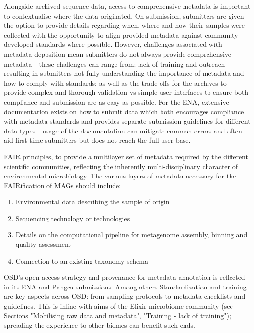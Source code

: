    Alongside archived sequence data, access to comprehensive metadata is important to contextualise where the data originated. 
   On submission, submitters are given the option to provide details regarding when, where and how their samples were collected with the opportunity to align provided metadata against community developed standards where possible. 
   However, challenges associated with metadata deposition mean submitters do not always provide comprehensive metadata - these challenges can range from: 
   lack of training and outreach resulting in submitters not fully understanding the importance of metadata and how to comply with standards; 
   as well as the trade-offs for the archives to provide complex and thorough validation vs simple user interfaces to ensure both compliance and submission are as easy as possible. 
   For the ENA, extensive documentation exists on how to submit data which both encourages compliance with metadata standards and provides separate submission guidelines for different data types - usage of the documentation can mitigate common errors and often aid first-time submitters but does not reach the full user-base. 

   FAIR principles, to provide a multilayer set of metadata required by the different scientific communities, reflecting the inherently multi-disciplinary character of environmental microbiology. 
   The various layers of metadata necessary for the FAIRification of MAGs should include:
   \begin{enumerate}
      \item Environmental data describing the sample of origin
      \item Sequencing technology or technologies
      \item Details on the computational pipeline for metagenome assembly, binning and quality assessment
      \item Connection to an existing taxonomy schema
   \end{enumerate}


   OSD’s open access strategy and provenance for metadata annotation is reflected in its ENA and Pangea submissions. 
   Among others Standardization and training are key aspects across OSD: from sampling protocols to metadata checklists and guidelines. 
   This is inline with aims of the Elixir microbiome community (see Sections "Mobilising raw data and metadata", 
   "Training - lack of training"); 
   spreading the experience to other biomes can benefit such ends.


